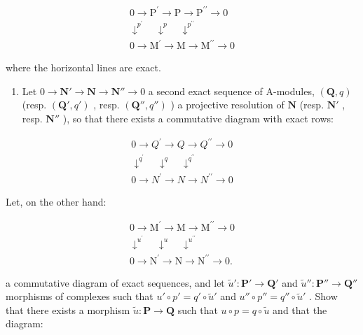\[
\begin{array}{c} 0 \to \mathrm{P} ^ {\prime} \to \mathrm{P} \to \mathrm{P} ^ {\prime \prime} \to 0 \\ \downarrow^ {p ^ {\prime}} \quad \downarrow^ {p} \quad \downarrow^ {p ^ {\prime \prime}} \\ 0 \to \mathrm{M} ^ {\prime} \to \mathrm{M} \to \mathrm{M} ^ {\prime \prime} \to 0 \end{array}
\]

where the horizontal lines are exact.

\begin{enumerate}
\def\labelenumi{\alph{enumi})}
\setcounter{enumi}{1}
\tightlist
\item
  Let \(0 \to \mathbf{N}' \to \mathbf{N} \to \mathbf{N}'' \to 0\) a second exact sequence of A-modules, \((\mathbf{Q}, q)\) (resp. \((\mathbf{Q}', q')\) , resp. \((\mathbf{Q}'', q'')\) ) a projective resolution of \(\mathbf{N}\) (resp. \(\mathbf{N}'\) , resp. \(\mathbf{N}''\) ), so that there exists a commutative diagram with exact rows:
\end{enumerate}

\[
\begin{array}{c}0 \rightarrow Q ^ {\prime} \rightarrow Q \rightarrow Q ^ {\prime \prime} \rightarrow 0\\\downarrow^ {q ^ {\prime}} \quad \downarrow^ {q} \quad \downarrow^ {q ^ {\prime \prime}}\\0 \rightarrow N ^ {\prime} \rightarrow N \rightarrow N ^ {\prime \prime} \rightarrow 0\end{array}
\]

Let, on the other hand:

\[
\begin{array}{c} 0 \to \mathrm{M} ^ {\prime} \to \mathrm{M} \to \mathrm{M} ^ {\prime \prime} \to 0 \\ \downarrow^ {u ^ {\prime}} \quad \downarrow^ {u} \quad \downarrow^ {u ^ {\prime \prime}} \\ 0 \to \mathrm{N} ^ {\prime} \to \mathrm{N} \to \mathrm{N} ^ {\prime \prime} \to 0. \end{array}
\]

a commutative diagram of exact sequences, and let \(\tilde{u}':\mathbf{P}'\to\mathbf{Q}'\) and \(\tilde{u}'':\mathbf{P}''\to\mathbf{Q}''\) morphisms of complexes such that \(u'\circ p'=q'\circ\tilde{u}'\) and \(u''\circ p''=q''\circ\tilde{u}'\) . Show that there exists a morphism \(\tilde{u}:\mathbf{P}\to\mathbf{Q}\) such that \(u\circ p=q\circ\tilde{u}\) and that the diagram:

